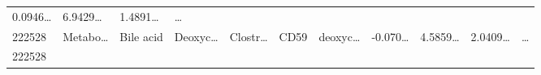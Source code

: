 \documentclass[
]{article}
\begin{document}
\begin{longtable}[]{@{}lllllllllll@{}}
\begin{minipage}[t]{0.07\columnwidth}
0.0946\ldots{}\strut
\end{minipage} & \begin{minipage}[t]{0.07\columnwidth}\raggedright
6.9429\ldots{}\strut
\end{minipage} & \begin{minipage}[t]{0.07\columnwidth}\raggedright
1.4891\ldots{}\strut
\end{minipage} & \begin{minipage}[t]{0.03\columnwidth}\raggedright
\ldots{}\strut
\end{minipage}\tabularnewline
\begin{minipage}[t]{0.05\columnwidth}\raggedright
222528\strut
\end{minipage} & \begin{minipage}[t]{0.07\columnwidth}\raggedright
Metabo\ldots{}\strut
\end{minipage} & \begin{minipage}[t]{0.07\columnwidth}\raggedright
Bile acid\strut
\end{minipage} & \begin{minipage}[t]{0.09\columnwidth}\raggedright
Deoxyc\ldots{}\strut
\end{minipage} & \begin{minipage}[t]{0.07\columnwidth}\raggedright
Clostr\ldots{}\strut
\end{minipage} & \begin{minipage}[t]{0.07\columnwidth}\raggedright
CD59\strut
\end{minipage} & \begin{minipage}[t]{0.09\columnwidth}\raggedright
deoxyc\ldots{}\strut
\end{minipage} & \begin{minipage}[t]{0.07\columnwidth}\raggedright
-0.070\ldots{}\strut
\end{minipage} & \begin{minipage}[t]{0.07\columnwidth}\raggedright
4.5859\ldots{}\strut
\end{minipage} & \begin{minipage}[t]{0.07\columnwidth}\raggedright
2.0409\ldots{}\strut
\end{minipage} & \begin{minipage}[t]{0.03\columnwidth}\raggedright
\ldots{}\strut
\end{minipage}\tabularnewline
\begin{minipage}[t]{0.05\columnwidth}\raggedright
222528\strut
\end{minipage} & \begin{minipage}[t]{0.07\columnwidth}\raggedright

\end{minipage}
\end{longtable}
\end{document}
